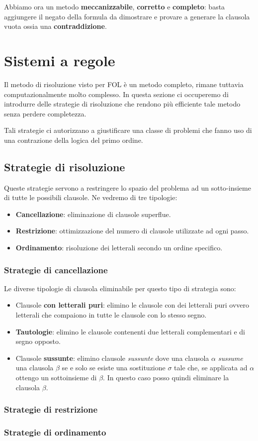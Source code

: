 Abbiamo ora un metodo \textbf{meccanizzabile}, \textbf{corretto} e \textbf{completo}: basta aggiungere il negato
della formula da dimostrare e provare a generare la clausola vuota ossia una \textbf{contraddizione}.

\section{Sistemi a regole}
Il metodo di risoluzione visto per FOL \`e un metodo completo, rimane tuttavia computazionalmente molto
complesso. In questa sezione ci occuperemo di introdurre delle strategie di risoluzione che rendono pi\`u
efficiente tale metodo senza perdere completezza.

Tali strategie ci autorizzano a giustificare una classe di problemi che fanno uso di una contrazione della
logica del primo ordine.

\subsection{Strategie di risoluzione}
Queste strategie servono a restringere lo spazio del problema ad un sotto-insieme di tutte le possibili
clausole. Ne vedremo di tre tipologie:
\begin{itemize}
	\item \textbf{Cancellazione}: eliminazione di clausole superflue.
	\item \textbf{Restrizione}: ottimizzazione del numero di clausole utilizzate ad ogni passo.
	\item \textbf{Ordinamento}: risoluzione dei letterali secondo un ordine specifico.
\end{itemize}

\subsubsection{Strategie di cancellazione}
Le diverse tipologie di clausola eliminabile per questo tipo di strategia sono:
\begin{itemize}
	\item Clausole \textbf{con letterali puri}: elimino le clausole con dei letterali puri ovvero letterali
	      che compaiono in tutte le clausole con lo stesso segno.
	\item \textbf{Tautologie}: elimino le clausole contenenti due letterali complementari e di segno opposto.
	\item Clausole \textbf{sussunte}: elimino clausole \emph{sussunte} dove una clausola $\alpha$
	      \emph{sussume} una clausola $\beta$ se e solo se esiste una sostituzione $\sigma$ tale che, se
	      applicata ad $\alpha$ ottengo un sottoinsieme di $\beta$. In questo caso posso quindi eliminare la
	      clausola $\beta$.
\end{itemize}

\subsubsection{Strategie di restrizione}

\subsubsection{Strategie di ordinamento}